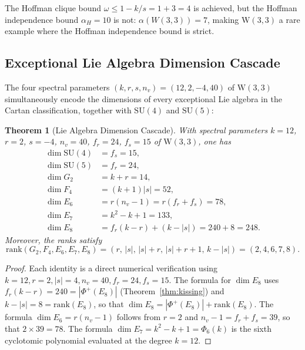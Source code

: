 \documentclass[12pt,a4paper]{article}
\newtheorem{theorem}{Theorem}[section]
\newcommand{\W}{\mathrm{W}(3,3)}
\newcommand{\nv}{n_{\!v}}
\newcommand{\fr}{f_{\!r}}
\newcommand{\fs}{f_{\!s}}
\begin{document}
\noindent
The Hoffman clique bound $\omega \le 1-k/s = 1+3 = 4$ is achieved, but the Hoffman
independence bound $\alpha_H = 10$ is not: $\alpha(W(3,3)) = 7$, making $\W$
a rare example where the Hoffman independence bound is strict.

\subsection{Exceptional Lie Algebra Dimension Cascade}

The four spectral parameters $(k,r,s,\nv)=(12,2,-4,40)$ of $\W$
simultaneously encode the dimensions of every exceptional Lie algebra
in the Cartan classification, together with $\mathrm{SU}(4)$ and
$\mathrm{SU}(5)$:

\begin{theorem}[Lie Algebra Dimension Cascade]
\label{thm:liecascade}
With spectral parameters $k=12$, $r=2$, $s=-4$, $\nv=40$,
$\fr=24$, $\fs=15$ of\/ $\W$, one has
\begin{align}
  \dim\mathrm{SU}(4) &= \fs = 15, \label{eq:dimsu4}\\
  \dim\mathrm{SU}(5) &= \fr = 24, \label{eq:dimsu5}\\
  \dim G_2 &= k + r = 14, \label{eq:dimg2}\\
  \dim F_4 &= (k+1)|s| = 52, \label{eq:dimf4}\\
  \dim E_6 &= r(\nv - 1) = r(\fr+\fs) = 78, \label{eq:dime6}\\
  \dim E_7 &= k^2 - k + 1 = 133, \label{eq:dime7}\\
  \dim E_8 &= \fr(k-r) + (k-|s|) = 240 + 8 = 248. \label{eq:dime8}
\end{align}
Moreover, the ranks satisfy
\begin{equation}
  \mathrm{rank}(G_2,F_4,E_6,E_7,E_8) = (r,\,|s|,\,|s|+r,\,|s|+r+1,\,k-|s|)
  = (2,4,6,7,8).
\end{equation}
\end{theorem}

\begin{proof}
Each identity is a direct numerical verification using
$k=12,r=2,|s|=4,\nv=40,\fr=24,\fs=15$.
The formula for $\dim E_8$ uses $\fr(k-r)=240=|\Phi^+(E_8)|$
(Theorem~\ref{thm:kissing}) and $k-|s|=8=\mathrm{rank}(E_8)$,
so that $\dim E_8 = |\Phi^+(E_8)|+\mathrm{rank}(E_8)$.
The formula $\dim E_6 = r(\nv-1)$ follows from $r=2$ and
$\nv-1=\fr+\fs=39$, so that $2\times 39=78$.
The formula $\dim E_7 = k^2-k+1 = \Phi_6(k)$ is the sixth
cyclotomic polynomial evaluated at the degree $k=12$.
\end{proof}
\end{document}
